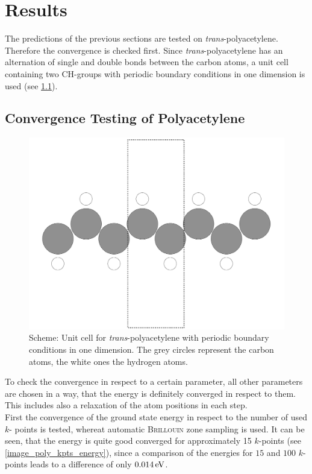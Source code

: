 \chapter{Results}

The predictions of the previous sections are tested on \emph{trans}-polyacetylene. Therefore the convergence is checked first. Since \emph{trans}-polyacetylene has an alternation of single and double bonds between the carbon atoms, a unit cell containing two CH-groups with periodic boundary conditions in one dimension is used (see \cref{image_scheme_polyacetylene_unit_cell}). 

\section{Convergence Testing of Polyacetylene}
\begin{figure}[!b]
	\centering
	\includegraphics[width = .65\textwidth]{Images/polyacetylene/convergence/polyacetylene_nice_unit_cell}
	\caption{Scheme: Unit cell for \emph{trans}-polyacetylene with periodic boundary conditions in one dimension. The grey circles represent the carbon atoms, the white ones the hydrogen atoms.}
	\label{image_scheme_polyacetylene_unit_cell}
\end{figure}
To check the convergence in respect to a certain parameter, all other parameters are chosen in a way, that the energy is definitely converged in respect to them. This includes also a relaxation of the atom positions in each step.\\
First the convergence of the ground state energy in respect to the number of used $k$- points is tested, whereat automatic \textsc{Brillouin} zone sampling is used. It can be seen, that the energy is quite good converged for approximately 15 $k$-points (see \cref{image_poly_kpts_energy}), since a comparison of the energies for $15$ and $100$ $k$-points leads to a difference of only $\unit[0.014]{eV}$.\\
